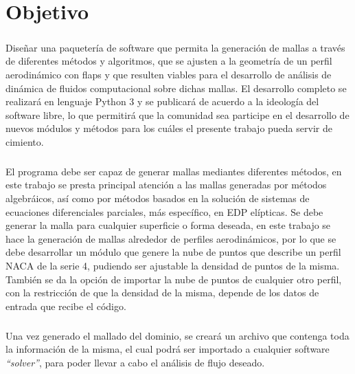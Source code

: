 \documentclass[letterpaper, openright, 12pt]{book}
\begin{document}

    \chapter*{Objetivo}

    \paragraph*{}
    Diseñar una paquetería de software que permita la generación de mallas a
    través de diferentes métodos y algoritmos, que se ajusten a la geometría de
    un perfil aerodinámico con flaps y que resulten viables para el desarrollo
    de análisis  de dinámica de fluidos computacional sobre dichas mallas.
    El desarrollo completo se realizará en lenguaje Python 3 y se publicará de
    acuerdo a la ideología del software libre, lo que permitirá que la comunidad
    sea participe en el desarrollo de nuevos módulos y métodos para los cuáles
    el presente trabajo pueda servir de cimiento.

    \paragraph*{}
    El programa debe ser capaz de generar  mallas mediantes diferentes
    métodos, en este trabajo se presta principal atención a las mallas
    generadas por métodos algebráicos, así como por métodos basados en la
    solución de sistemas de ecuaciones diferenciales parciales,
    más específico, en EDP elípticas. Se debe generar la malla para
    cualquier superficie o forma deseada, en este trabajo se hace la
    generación de mallas alrededor de perfiles aerodinámicos, por lo que se
    debe desarrollar un módulo que genere la nube de puntos que describe un
    perfil NACA de la serie 4, pudiendo ser ajustable la densidad de puntos
    de la misma. También se da la opción de importar la nube de puntos de
    cualquier otro perfil, con la restricción de que la densidad de la
    misma, depende de los datos de entrada que recibe el código.

    \paragraph*{}
    Una vez generado el mallado del dominio, se creará un archivo que
    contenga toda la información de la misma, el cual podrá ser importado a
    cualquier software \textit{``solver''}, para poder llevar a cabo el
    análisis de flujo deseado.
\end{document}
